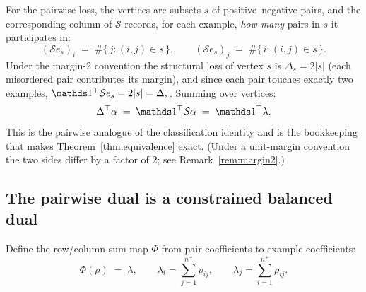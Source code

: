 For the pairwise loss, the vertices are subsets $s$ of positive--negative
pairs, and the corresponding column of $\mathcal{S}$ records, for each
example, \emph{how many} pairs in $s$ it participates in:
\begin{equation}
(\mathcal{S} e_s)_i \;=\; \#\{\, j : (i,j) \in s \,\}, \qquad
(\mathcal{S} e_s)_j \;=\; \#\{\, i : (i,j) \in s \,\}.
\label{eq:pair_counts}
\end{equation}
Under the margin-2 convention the structural loss of vertex $s$ is
$\Delta_s = 2|s|$ (each misordered pair contributes its margin), and since
each pair touches exactly two examples,
$\mathbbm{1}^\top \mathcal{S} e_s = 2|s| = \Delta_s$. Summing over vertices:
\begin{equation}
\Delta^\top \alpha \;=\; \mathbbm{1}^\top \mathcal{S} \alpha
\;=\; \mathbbm{1}^\top \lambda .
\label{eq:margin_identity}
\end{equation}
This is the pairwise analogue of the classification identity and is the
bookkeeping that makes Theorem~\ref{thm:equivalence} exact. (Under a
unit-margin convention the two sides differ by a factor of $2$; see
Remark~\ref{rem:margin2}.)

\subsection{The pairwise dual is a constrained balanced dual}
\label{sec:equivalence}

Define the row/column-sum map $\Phi$ from pair coefficients to example
coefficients:
\begin{equation}
\Phi(\rho) \;=\; \lambda, \qquad
\lambda_i = \sum_{j=1}^{n^-} \rho_{ij}, \qquad
\lambda_j = \sum_{i=1}^{n^+} \rho_{ij}.
\label{eq:phi_map}
\end{equation}


